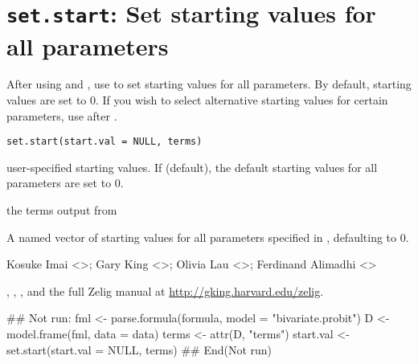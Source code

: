  \section{{\tt set.start}: Set starting values for all parameters}\label{ss:set.start}
\begin{Description}\relax
After using  and , use 
 to set starting values for all parameters.  By default, starting values are set to 0.  If 
you wish to select alternative starting values for certain parameters, use  after 
.
\end{Description}
\begin{Usage}
\begin{verbatim}
set.start(start.val = NULL, terms)
\end{verbatim}
\end{Usage}
\begin{Arguments}
\begin{ldescription}
\item[\code{start.val}] user-specified starting values.  If  (default), the default 
starting values for all parameters are set to 0.
\item[\code{terms}] the terms output from 
\end{ldescription}
\end{Arguments}
\begin{Value}
A named vector of starting values for all parameters specified in , defaulting to 0.
\end{Value}
\begin{Author}\relax
Kosuke Imai <>; Gary King
<>; Olivia Lau <>; Ferdinand Alimadhi
<>
\end{Author}
\begin{SeeAlso}\relax
{}, , , and the 
full Zelig manual at \url{http://gking.harvard.edu/zelig}.
\end{SeeAlso}
\begin{Examples}
\begin{ExampleCode}
## Not run: 
fml <- parse.formula(formula, model = "bivariate.probit")
D <- model.frame(fml, data = data)
terms <- attr(D, "terms")
start.val <- set.start(start.val = NULL, terms)
## End(Not run)\end{ExampleCode}
\end{Examples}


